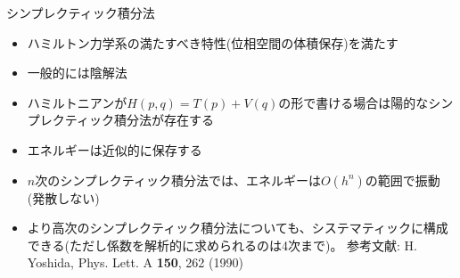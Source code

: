\begin{frame}[t,fragile]{シンプレクティック積分法}
  \begin{itemize}
  \item ハミルトン力学系の満たすべき特性(位相空間の体積保存)を満たす
  \item 一般的には陰解法
  \item ハミルトニアンが$H(p,q) = T(p) + V(q)$の形で書ける場合は陽的なシンプレクティック積分法が存在する
  \item エネルギーは近似的に保存する
  \item $n$次のシンプレクティック積分法では、エネルギーは$O(h^n)$の範囲で振動(発散しない)
  \item より高次のシンプレクティック積分法についても、システマティックに構成できる(ただし係数を解析的に求められるのは4次まで)。
    参考文献: H. Yoshida, Phys. Lett. A {\bf 150}, 262 (1990)
  \end{itemize}
\end{frame}
